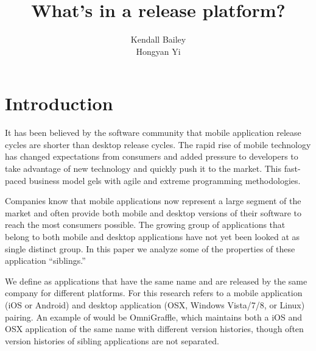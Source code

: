 \documentclass{acm_proc_article-sp}
\begin{document}
\title{What's in a release platform? }

\author{
\alignauthor
Kendall Bailey \\
\alignauthor
Hongyan Yi \\
}

\maketitle
\begin{abstract}



\end{abstract}


\section{Introduction}

It has been believed by the software community that mobile application release cycles are shorter than desktop release cycles. 
The rapid rise of mobile technology has changed expectations from consumers and added pressure to developers to take advantage of new technology and quickly push it to the market.
This fast-paced business model gels with agile and extreme programming methodologies.

Companies know that mobile applications now represent a large segment of the market and often provide both mobile and desktop versions of their software to reach the most consumers possible.
The growing group of applications that belong to both mobile and desktop applications have not yet been looked at as single distinct group.
In this paper we analyze some of the properties of these application ``siblings.''

We define \textbf{\sibs} as applications that have the same name and are released by the same company for different platforms. 
For this research \sibs refers to a mobile application (iOS or Android) and desktop application (OSX, Windows Vista/7/8, or Linux) pairing.
An example of \sibs would be OmniGraffle, which maintains both a iOS and OSX application of the same name with different version histories, though often version histories of sibling applications are not separated.
\end{document}

